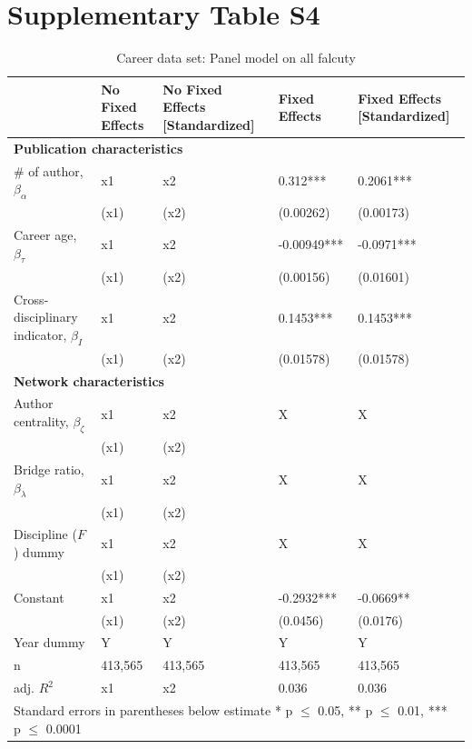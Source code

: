 \documentclass[10pt]{article}          %
\begin{document}
\section{Supplementary Table S4}
\begin{table}[H]
\begin{tabular}{m{5cm} m{3.0cm} m{3cm} m{2.5cm} m{2.7cm}}
\hline
\hline
& \textbf{No Fixed Effects} & \textbf{No Fixed Effects [Standardized]} & \textbf{Fixed Effects} & \textbf{Fixed Effects [Standardized]} \\ \hline
\multicolumn{5}{l}{\textbf{Publication characteristics}} \\
\rowcolor{lightgray}
{\# of author, $\beta_\alpha$} & x1 & x2 & 0.312*** & 0.2061*** \\
                             & (x1) & (x2) & (0.00262) & (0.00173) \\
\rowcolor{lightgray}
{Career age, $\beta_\tau$} & x1 & x2 & -0.00949*** & -0.0971*** \\
                         & (x1) & (x2) & (0.00156) & (0.01601) \\
\rowcolor{lightgray}
{Cross-disciplinary indicator, $\beta_I$} & x1 & x2 & 0.1453*** & 0.1453*** \\
                                        & (x1) & (x2) & (0.01578) & (0.01578) \\ \hline
\multicolumn{5}{l}{\textbf{Network characteristics}} \\
\rowcolor{lightgray}
{Author centrality, $\beta_\zeta$} & x1 & x2 & X & X \\
                             & (x1) & (x2) &  &  \\
\rowcolor{lightgray}
{Bridge ratio, $\beta_\lambda$} & x1 & x2 & X & X \\
                             & (x1) & (x2) &  &  \\
\rowcolor{lightgray}
{Discipline ($F$) dummy}     & x1 & x2 & X & X \\
                             & (x1) & (x2) & &  \\
\rowcolor{lightgray}
{Constant}                 & x1 & x2 & -0.2932*** & -0.0669** \\
                         & (x1) & (x2) & (0.0456) & (0.0176) \\
\rowcolor{lightgray}
{Year dummy}            & Y & Y & Y & Y \\ \hline
\rowcolor{lightgray}
{n}                      & 413,565 & 413,565 & 413,565 & 413,565 \\
\rowcolor{lightgray}
{adj. $R^2$}             & x1 & x2 & 0.036 & 0.036 \\ \hline \hline
\multicolumn{5}{l}{\footnotesize{Standard errors in parentheses below estimate * p $\leq$ 0.05, ** p $\leq$ 0.01, *** p $\leq$ 0.0001}}

\end{tabular}
\caption{Career data set: Panel model on all falcuty}
\label{tbl:sT5}
\end{table}
\end{document}
